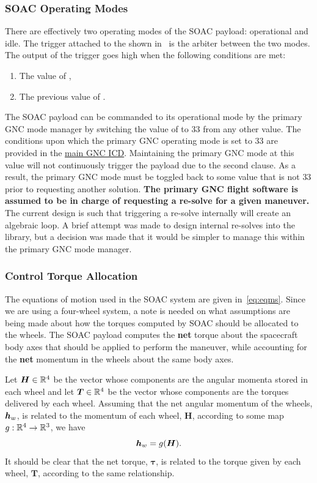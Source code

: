 \documentclass[10pt]{article}
\begin{document}
\subsubsection{SOAC Operating Modes}\label{sec3:op_modes}
There are effectively two operating modes of the SOAC payload: operational and idle. The trigger attached to the  shown in~ is the arbiter between the two modes. The output of the trigger goes high when the following conditions are met:
\begin{enumerate}
\item The value of ,
\item The previous value of .
\end{enumerate}
The SOAC payload can be commanded to its operational mode by the primary GNC mode manager by switching the value of  to $33$ from any other value. The conditions upon which the primary GNC operating mode is set to $33$ are provided in the \href{https://drive.google.com/open?id=1wTjmsQdXGk9jmEHy59fZAdBJJ3r1IE4LGFjHT2S5png}{main GNC ICD}. Maintaining the primary GNC mode at this value will not continuously trigger the payload due to the second clause. As a result, the primary GNC mode must be toggled back to some value that is not $33$ prior to requesting another solution. \textbf{The primary GNC flight software is assumed to be in charge of requesting a re-solve for a given maneuver.} The current design is such that triggering a re-solve internally will create an algebraic loop. A brief attempt was made to design internal re-solves into the library, but a decision was made that it would be simpler to manage this within the primary GNC mode manager. 

\subsubsection{Control Torque Allocation}\label{sec3:allocation}

The equations of motion used in the SOAC system are given in~\eqref{eq:eqms}. Since we are using a four-wheel system, a note is needed on what assumptions are being made about how the torques computed by SOAC should be allocated to the wheels. The SOAC payload computes the \textbf{net} torque about the spacecraft body axes that should be applied to perform the maneuver, while accounting for the \textbf{net} momentum in the wheels about the same body axes. 

Let $\bm{H}\in{\mathbb{R}}^4$ be the vector whose components are the angular momenta stored in each wheel and let $\bm{T}\in{\mathbb{R}}^4$ be the vector whose components are the torques delivered by each wheel. Assuming that the net angular momentum of the wheels, $\bm{h}_w$, is related to the momentum of each wheel, $\bm{H}$, according to some map $g : {\mathbb{R}}^4 \rightarrow {\mathbb{R}}^3$, we have
\begin{equation}
\bm{h}_w = g(\bm{H}).
\end{equation}
It should be clear that the net torque, $\bm{\tau}$, is related to the torque given by each wheel, $\bm{T}$, according to the same relationship. 
\end{document}
